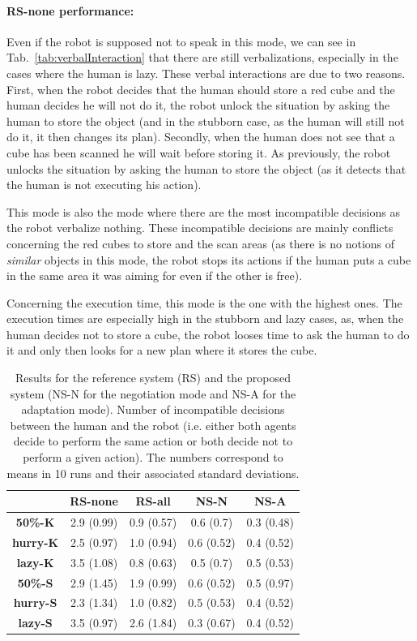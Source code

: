 \documentclass[english,a4paper,11pt,twoside]{StyleThese}
\begin{document}
\paragraph{RS-none performance:} Even if the robot is supposed not to speak in this mode, we can see in Tab.~\ref{tab:verbalInteraction} that there are still verbalizations, especially in the cases where the human is lazy. These verbal interactions are due to two reasons. First, when the robot decides that the human should store a red cube and the human decides he will not do it, the robot unlock the situation by asking the human to store the object (and in the stubborn case, as the human will still not do it, it then changes its plan). Secondly, when the human does not see that a cube has been scanned he will wait before storing it. As previously, the robot unlocks the situation by asking the human to store the object (as it detects that the human is not executing his action). 

This mode is also the mode where there are the most incompatible decisions as the robot verbalize nothing. These incompatible decisions are mainly conflicts concerning the red cubes to store and the scan areas (as there is no notions of \textit{similar} objects in this mode, the robot stops its actions if the human puts a cube in the same area it was aiming for even if the other is free).

Concerning the execution time, this mode is the one with the highest ones. The execution times are especially high in the stubborn and lazy cases, as, when the human decides not to store a cube, the robot looses time to ask the human to do it and only then looks for a new plan where it stores the cube. 

\begin{table}[!h]
\centering
  \begin{tabular}{|c||c|c|c|c|}
  \hline
     & \textbf{RS-none} & \textbf{RS-all} & \textbf{NS-N} & \textbf{NS-A} \\
  \hline
  \hline
     \textbf{50\%-K} & 2.9 (0.99) & 0.9 (0.57) & 0.6 (0.7) & 0.3 (0.48) \\
  \hline
     \textbf{hurry-K} & 2.5 (0.97) & 1.0 (0.94) & 0.6 (0.52) & 0.4 (0.52)\\
  \hline
     \textbf{lazy-K} & 3.5 (1.08) & 0.8 (0.63) & 0.5 (0.7) & 0.5 (0.53) \\
  \hline
     \textbf{50\%-S} & 2.9 (1.45) & 1.9 (0.99) & 0.6 (0.52) & 0.5 (0.97) \\
  \hline
     \textbf{hurry-S} & 2.3 (1.34) & 1.0 (0.82) & 0.5 (0.53) & 0.4 (0.52) \\
  \hline
     \textbf{lazy-S} & 3.5 (0.97) & 2.6 (1.84) & 0.3 (0.67) & 0.4 (0.52)  \\
  \hline
  \end{tabular}
   \caption{Results for the reference system (RS) and the proposed system (NS-N for the negotiation mode and NS-A for the adaptation mode). Number of incompatible decisions between the human and the robot (i.e. either both agents decide to perform the same action or both decide not to perform a given action). The numbers correspond to means in 10 runs and their associated standard deviations.}
   \label{tab:incompatibleDecisions} 
\end{table}
\end{document}
